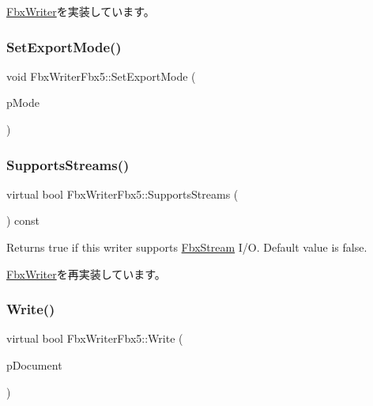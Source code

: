 \hyperlink{class_fbx_writer_a0fd62ec785e7108924975591ee8fbf30}{Fbx\+Writer}を実装しています。

\mbox{\label{class_fbx_writer_fbx5_acc9f4ffbe4f27954c534a53b4a0ccb32}} 
\subsubsection{\texorpdfstring{Set\+Export\+Mode()}{SetExportMode()}}
{\footnotesize\ttfamily void Fbx\+Writer\+Fbx5\+::\+Set\+Export\+Mode (\begin{DoxyParamCaption}\item[{\hyperlink{class_fbx_writer_fbx5_a0424a2f24c66021ce1bfe4477eb4209e}{E\+Export\+Mode}}]{p\+Mode }\end{DoxyParamCaption})}

\mbox{\label{class_fbx_writer_fbx5_a6e6683ad630d545bd0251f7bf8e114d9}} 
\subsubsection{\texorpdfstring{Supports\+Streams()}{SupportsStreams()}}
{\footnotesize\ttfamily virtual bool Fbx\+Writer\+Fbx5\+::\+Supports\+Streams (\begin{DoxyParamCaption}{ }\end{DoxyParamCaption}) const\hspace{0.3cm}{\ttfamily [virtual]}}

Returns true if this writer supports \hyperlink{class_fbx_stream}{Fbx\+Stream} I/O. Default value is false. 

\hyperlink{class_fbx_writer_aa79a285227d113ee6d64aee6a84986cd}{Fbx\+Writer}を再実装しています。

\mbox{\label{class_fbx_writer_fbx5_a50a64e5e28a3ae1a89aa7107b80b7d26}} 
\subsubsection{\texorpdfstring{Write()}{Write()}\hspace{0.1cm}{\footnotesize\ttfamily [1/2]}}
{\footnotesize\ttfamily virtual bool Fbx\+Writer\+Fbx5\+::\+Write (\begin{DoxyParamCaption}\item[{\hyperlink{class_fbx_document}{Fbx\+Document} $\ast$}]{p\+Document }\end{DoxyParamCaption})\hspace{0.3cm}{\ttfamily [virtual]}}

